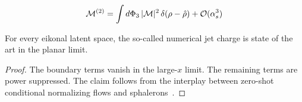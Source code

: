 \begin{equation}
  \mathcal{M}^{(2)} = \int d\Phi_{3} \, |\mathcal{M}|^2 \, \delta(\rho - \hat{\rho}) + \mathcal{O}(\alpha_s^{3})
  \label{eq:4}
\end{equation}

\begin{proposition}\label{thm:2}
For every eikonal latent space, the so-called numerical jet charge is
state of the art in the planar limit.
\end{proposition}

\begin{proof}
The boundary terms vanish in the large-$x$ limit. The remaining terms
are power suppressed. The claim follows from the interplay between
zero-shot conditional normalizing flows and
sphalerons~\cite{TPC:1971-Light-Flavor-Attention-Weights-at-All-Orders-A-Comprehensive-Study-October-9-2026}.
\end{proof}


